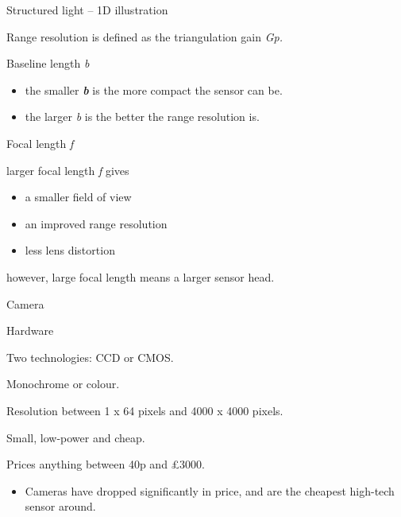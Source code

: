 \documentclass[compress]{beamer}
\begin{document}
\begin{frame}{Structured light -- 1D illustration}

Range resolution is defined as the triangulation gain \emph{Gp.}

Baseline length \emph{b}

\begin{itemize}

\item
  the smaller \textbf{\emph{b}} is the more compact the sensor can be.
\item
  the larger \emph{b} is the better the range resolution is.
\end{itemize}

Focal length \emph{f}

larger focal length \emph{f} gives

\begin{itemize}

\item
  a smaller field of view
\item
  an improved range resolution
\item
  less lens distortion
\end{itemize}

however, large focal length means a larger sensor head.

\end{frame}

\begin{frame}{Camera}

Hardware

Two technologies: CCD or CMOS.

Monochrome or colour.

Resolution between 1 x 64 pixels and 4000 x 4000 pixels.

Small, low-power and cheap.

Prices anything between 40p and £3000.

\begin{itemize}

\item
  Cameras have dropped significantly in price, and are the cheapest
  high-tech sensor around.
\end{itemize}

\end{frame}
\end{document}
